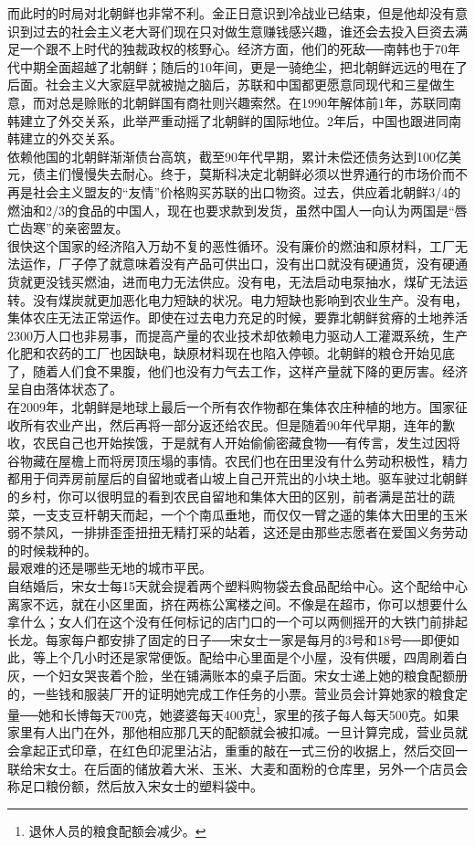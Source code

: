 而此时的时局对北朝鲜也非常不利。金正日意识到冷战业已结束，但是他却没有意识到过去的社会主义老大哥们现在只对做生意赚钱感兴趣，谁还会去投入巨资去满足一个跟不上时代的独裁政权的核野心。经济方面，他们的死敌──南韩也于70年代中期全面超越了北朝鲜；随后的10年间，更是一骑绝尘，把北朝鲜远远的甩在了后面。社会主义大家庭早就被抛之脑后，苏联和中国都更愿意同现代和三星做生意，而对总是赊账的北朝鲜国有商社则兴趣索然。在1990年解体前1年，苏联同南韩建立了外交关系，此举严重动摇了北朝鲜的国际地位。2年后，中国也跟进同南韩建立的外交关系。\\

依赖他国的北朝鲜渐渐债台高筑，截至90年代早期，累计未偿还债务达到100亿美元，债主们慢慢失去耐心。终于，莫斯科决定北朝鲜必须以世界通行的市场价而不再是社会主义盟友的“友情”价格购买苏联的出口物资。过去，供应着北朝鲜3/4的燃油和2/3的食品的中国人，现在也要求款到发货，虽然中国人一向认为两国是“唇亡齿寒”的亲密盟友。\\

很快这个国家的经济陷入万劫不复的恶性循环。没有廉价的燃油和原材料，工厂无法运作，厂子停了就意味着没有产品可供出口，没有出口就没有硬通货，没有硬通货就更没钱买燃油，进而电力无法供应。没有电，无法启动电泵抽水，煤矿无法运转。没有煤炭就更加恶化电力短缺的状况。电力短缺也影响到农业生产。没有电，集体农庄无法正常运作。即使在过去电力充足的时候，要靠北朝鲜贫瘠的土地养活2300万人口也非易事，而提高产量的农业技术却依赖电力驱动人工灌溉系统，生产化肥和农药的工厂也因缺电，缺原材料现在也陷入停顿。北朝鲜的粮仓开始见底了，随着人们食不果腹，他们也没有力气去工作，这样产量就下降的更厉害。经济呈自由落体状态了。\\

在2009年，北朝鲜是地球上最后一个所有农作物都在集体农庄种植的地方。国家征收所有农业产出，然后再将一部分返还给农民。但是随着90年代早期，连年的歉收，农民自己也开始挨饿，于是就有人开始偷偷密藏食物──有传言，发生过因将谷物藏在屋檐上而将房顶压塌的事情。农民们也在田里没有什么劳动积极性，精力都用于伺弄房前屋后的自留地或者山坡上自己开荒出的小块土地。驱车驶过北朝鲜的乡村，你可以很明显的看到农民自留地和集体大田的区别，前者满是茁壮的蔬菜，一支支豆杆朝天而起，一个个南瓜垂地，而仅仅一臂之遥的集体大田里的玉米弱不禁风，一排排歪歪扭扭无精打采的站着，这还是由那些志愿者在爱国义务劳动的时候栽种的。\\

最艰难的还是哪些无地的城市平民。\\

自结婚后，宋女士每15天就会提着两个塑料购物袋去食品配给中心。这个配给中心离家不远，就在小区里面，挤在两栋公寓楼之间。不像是在超市，你可以想要什么拿什么；女人们在这个没有任何标记的店门口的一个可以两侧摇开的大铁门前排起长龙。每家每户都安排了固定的日子──宋女士一家是每月的3号和18号──即便如此，等上个几小时还是家常便饭。配给中心里面是个小屋，没有供暖，四周刷着白灰，一个妇女哭丧着个脸，坐在铺满账本的桌子后面。宋女士递上她的粮食配额册的，一些钱和服装厂开的证明她完成工作任务的小票。营业员会计算她家的粮食定量──她和长博每天700克，她婆婆每天400克\footnote{退休人员的粮食配额会减少。}，家里的孩子每人每天500克。如果家里有人出门在外，那他相应那几天的配额就会被扣减。一旦计算完成，营业员就会拿起正式印章，在红色印泥里沾沾，重重的敲在一式三份的收据上，然后交回一联给宋女士。在后面的储放着大米、玉米、大麦和面粉的仓库里，另外一个店员会称足口粮份额，然后放入宋女士的塑料袋中。\\

